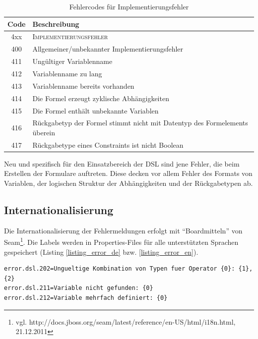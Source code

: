 \begin{table}
\begin{tabular}[ht]{|c | p{11cm}|}
	\hline
	\textbf{Code} & \textbf{Beschreibung}\\
	\hline
  	\hline
  	4xx  & \multicolumn{1}{|l|}{\textsc{Implementierungsfehler}} \\
  	\hline
  	400  & Allgemeiner/unbekannter Implementierungsfehler    \\
  	\hline
  	411  & Ungültiger Variablenname    \\
  	\hline
  	412  & Variablenname zu lang    \\
  	\hline
  	413  & Variablenname bereits vorhanden   \\
  	\hline
  	414  & Die Formel erzeugt zyklische Abhängigkeiten    \\
  	\hline
  	415  & Die Formel enthält unbekannte Variablen    \\
  	\hline
  	416  & Rückgabetyp der Formel stimmt nicht mit Datentyp des Formelements überein    \\
  	\hline
  	417  & Rückgabetype eines Constraints ist nicht Boolean    \\
  	\hline
\end{tabular}
\caption{Fehlercodes für Implementierungsfehler}
\end{table}

Neu und spezifisch für den Einsatzbereich der DSL sind jene Fehler, die beim Erstellen der Formulare auftreten. Diese decken vor allem Fehler des Formats von Variablen, der logischen Struktur der Abhängigkeiten und der Rückgabetypen ab.



\subsection{Internationalisierung}

Die Internationalisierung der Fehlermeldungen erfolgt mit ``Boardmitteln'' von Seam\footnote{ vgl. http://docs.jboss.org/seam/latest/reference/en-US/html/i18n.html, 21.12.2011}. Die Labels werden in Properties-Files für alle unterstützten Sprachen ge\-spei\-chert (Listing \ref{listing_error_de} bzw. \ref{listing_error_en}).

\begin{lstlisting}[float = htbp,caption={Deutsche Fehlermeldungen },label=listing_error_de]
error.dsl.202=Ungueltige Kombination von Typen fuer Operator {0}: {1}, {2}
error.dsl.211=Variable nicht gefunden: {0}
error.dsl.212=Variable mehrfach definiert: {0}
\end{lstlisting}


